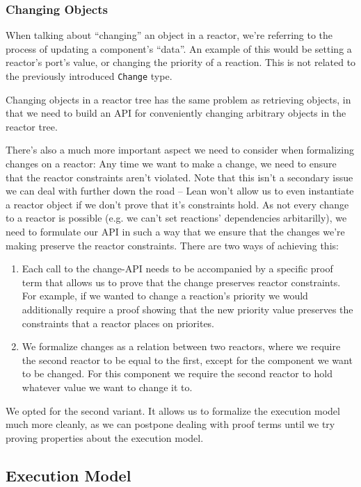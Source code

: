 \subsubsection{Changing Objects}

When talking about ``changing'' an object in a reactor, we're referring to the process of updating a component's ``data''.
An example of this would be setting a reactor's port's value, or changing the priority of a reaction.
This is not related to the previously introduced \lstinline{Change} type.

Changing objects in a reactor tree has the same problem as retrieving objects, in that we need to build an API for conveniently changing arbitrary objects in the reactor tree.

There's also a much more important aspect we need to consider when formalizing changes on a reactor:
Any time we want to make a change, we need to ensure that the reactor constraints aren't violated.
Note that this isn't a secondary issue we can deal with further down the road -- Lean won't allow us to even instantiate a reactor object if we don't prove that it's constraints hold.
As not every change to a reactor is possible (e.g. we can't set reactions' dependencies arbitarilly), we need to formulate our API in such a way that we ensure that the changes we're making preserve the reactor constraints.
There are two ways of achieving this:

\begin{enumerate}
  \item Each call to the change-API needs to be accompanied by a specific proof term that allows us to prove that the change preserves reactor constraints.
        For example, if we wanted to change a reaction's priority we would additionally require a proof showing that the new priority value preserves the constraints that a reactor places on priorites.
  \item We formalize changes as a relation between two reactors, where we require the second reactor to be equal to the first, except for the component we want to be changed. 
        For this component we require the second reactor to hold whatever value we want to change it to.
\end{enumerate}

We opted for the second variant.
It allows us to formalize the execution model much more cleanly, as we can postpone dealing with proof terms until we try proving properties about the execution model.

\subsection{Execution Model}

